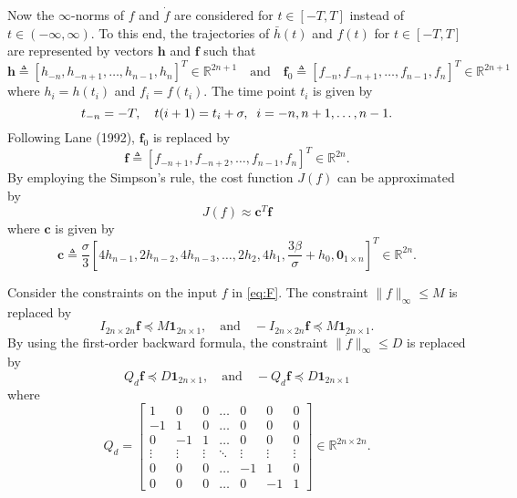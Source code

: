 \documentclass[a4paper,11pt]{article}
\theoremstyle{definition}
\begin{document}
Now the $\infty$-norms of $f$ and $\dot{f}$ are considered for $t\in[-T,T]$ instead of $t\in(-\infty,\infty)$.
To this end, the trajectories of $\bar{h}(t)$ and $f(t)$ for $t\in[-T,T]$ are represented by vectors 
    $\mathbf{h}$ and $\mathbf{f}$ such that
\[
   \mathbf{h} \triangleq [h_{-n},h_{-n+1},\ldots,h_{n-1},h_n]^T\in\mathbb{R}^{2n+1}\quad \text{and}\quad 
  \mathbf{f}_0 \triangleq [f_{-n},f_{-n+1},\ldots,f_{n-1},f_n]^T \in\mathbb{R}^{2n+1}
\]
where $h_i = h(t_i)$ and $f_i = f(t_i)$.
The time point $t_i$ is given by
\[
    t_{-n} = -T,\quad t(i+1) = t_i+\sigma,\;\; i = -n,\-n+1,\ldots,n-1.
\]
Following Lane (1992), $\mathbf{f}_0$ is replaced by
 \[
       \mathbf{f} \triangleq [f_{-n+1},f_{-n+2},\ldots,f_{n-1},f_n]^T \in\mathbb{R}^{2n}.
 \]
 By employing the Simpson’s rule, the cost function $J(f)$ can be approximated by
\begin{equation}\label{eq:cost_new}
    J(f) \approx \mathbf{c}^T\mathbf{f}
\end{equation}
    where $\mathbf{c}$ is given by
\begin{equation}\label{eq:c}
    \mathbf{c}\triangleq \frac{\sigma}{3}[4h_{n-1},2h_{n-2},4h_{n-3},\ldots,2h_2,4h_1,\frac{3\beta}{\sigma}+h_0,
                                      \mathbf{0}_{1\times n}]^T\in\mathbb{R}^{2n}.
\end{equation}


Consider the constraints on the input $f$ in \eqref{eq:F}.
The constraint $\|f\|_\infty\le M$ is replaced by
\begin{equation}\label{eq:constrM}
    I_{2n\times 2n}\mathbf{f} \preceq M\mathbf{1}_{2n\times 1},\quad\text{and}\quad  
    -I_{2n\times 2n}\mathbf{f} \preceq M\mathbf{1}_{2n\times 1}.    
\end{equation}
By using the first-order backward formula, the constraint $\|\dot{f}\|_\infty\le D$ is replaced by
\begin{equation}\label{eq:constrD}
    Q_d\mathbf{f} \preceq D\mathbf{1}_{2n\times 1},\quad\text{and}\quad 
    -Q_d\mathbf{f} \preceq D\mathbf{1}_{2n\times 1}
\end{equation}
where 
\[
Q_d =
\begin{bmatrix}
 1 & 0 & 0 & \ldots & 0 & 0 & 0 \\
-1 & 1 & 0 & \ldots & 0 & 0 & 0  \\
0 & -1 & 1 & \ldots & 0 & 0 & 0  \\
\vdots & \vdots & \vdots &\ddots & \vdots & \vdots & \vdots  \\
 0 & 0 & 0 & \ldots & -1 & 1 & 0  \\
 0 & 0 & 0 & \ldots & 0 & -1 & 1  
\end{bmatrix}\in\mathbb{R}^{2n\times 2n}.
\]
\end{document}
